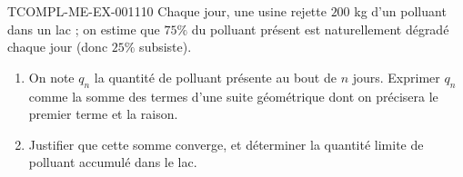 \begin{exercice}{TCOMPL-ME-EX-001}{1}{10}
Chaque jour, une usine rejette $200$ kg d'un polluant dans un lac ; on estime
que $75\%$ du polluant présent est naturellement dégradé chaque jour (donc
$25\%$ subsiste).
\begin{enumerate}
  \item On note $q_n$ la quantité de polluant présente au bout de $n$ jours.
        Exprimer $q_n$ comme la somme des termes d'une suite géométrique dont
        on précisera le premier terme et la raison.
  \item Justifier que cette somme converge, et déterminer la quantité limite
        de polluant accumulé dans le lac.
\end{enumerate}
\end{exercice}
